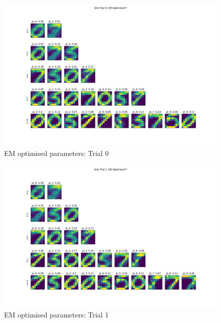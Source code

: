 \documentclass[12pt]{article}
\begin{document}
\begin{enumerate}
\begin{figure}[h]
  \centering
  \includegraphics[scale=0.3]{outputs/q3/q3e-0-optimised-p}
  \caption{EM optimised parameters: Trial 0}
  \label{fig:3e-initialised-p-trial-0}
\end{figure}
\begin{figure}[h]
  \centering
  \includegraphics[scale=0.3]{outputs/q3/q3e-1-optimised-p}
  \caption{EM optimised parameters: Trial 1}
  \label{fig:3e-initialised-p-trial-1}
\end{figure}
\newpage


\end{enumerate}
\end{document}
